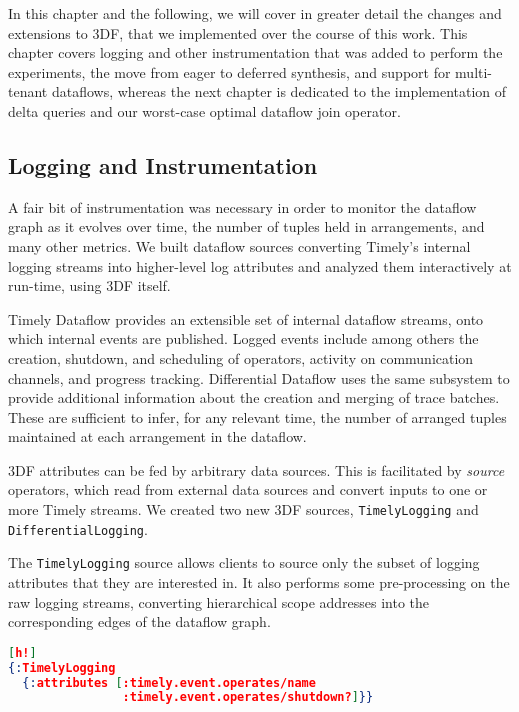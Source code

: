 \documentclass[../index.tex]{subfiles}
\begin{document}
In this chapter and the following, we will cover in greater detail the
changes and extensions to 3DF, that we implemented over the course of
this work. This chapter covers logging and other instrumentation that
was added to perform the experiments, the move from eager to deferred
synthesis, and support for multi-tenant dataflows, whereas the next
chapter is dedicated to the implementation of delta queries and our
worst-case optimal dataflow join operator.

\subsection{Logging and Instrumentation} \label{logging}

A fair bit of instrumentation was necessary in order to monitor the
dataflow graph as it evolves over time, the number of tuples held in
arrangements, and many other metrics. We built dataflow sources
converting Timely's internal logging streams into higher-level log
attributes and analyzed them interactively at run-time, using 3DF
itself.

Timely Dataflow provides an extensible set of internal dataflow
streams, onto which internal events are published. Logged events
include among others the creation, shutdown, and scheduling of
operators, activity on communication channels, and progress
tracking. Differential Dataflow uses the same subsystem to provide
additional information about the creation and merging of trace
batches. These are sufficient to infer, for any relevant time, the
number of arranged tuples maintained at each arrangement in the
dataflow.

3DF attributes can be fed by arbitrary data sources. This is
facilitated by \emph{source} operators, which read from external data
sources and convert inputs to one or more Timely streams. We created
two new 3DF sources, \texttt{TimelyLogging} and
\texttt{DifferentialLogging}.

The \texttt{TimelyLogging} source allows clients to source only the
subset of logging attributes that they are interested in. It also
performs some pre-processing on the raw logging streams, converting
hierarchical scope addresses into the corresponding edges of the
dataflow graph.

\begin{lstlisting}[language=json][h!]
{:TimelyLogging
  {:attributes [:timely.event.operates/name
                :timely.event.operates/shutdown?]}}
\end{lstlisting}
\end{document}
